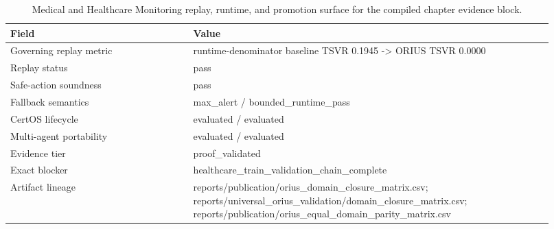 \begin{table}[htbp]
\centering
\small
\caption{Medical and Healthcare Monitoring replay, runtime, and promotion surface for the compiled chapter evidence block.}
\label{tab:healthcare-replay-surface}
\begin{tabular}{p{0.31\linewidth}p{0.61\linewidth}}
\toprule
\textbf{Field} & \textbf{Value}\\
\midrule
Governing replay metric & runtime-denominator baseline TSVR 0.1945 -> ORIUS TSVR 0.0000\\
Replay status & pass\\
Safe-action soundness & pass\\
Fallback semantics & max\_alert / bounded\_runtime\_pass\\
CertOS lifecycle & evaluated / evaluated\\
Multi-agent portability & evaluated / evaluated\\
Evidence tier & proof\_validated\\
Exact blocker & healthcare\_train\_validation\_chain\_complete\\
Artifact lineage & reports/publication/orius\_domain\_closure\_matrix.csv; reports/universal\_orius\_validation/domain\_closure\_matrix.csv; reports/publication/orius\_equal\_domain\_parity\_matrix.csv\\
\bottomrule
\end{tabular}
\end{table}
